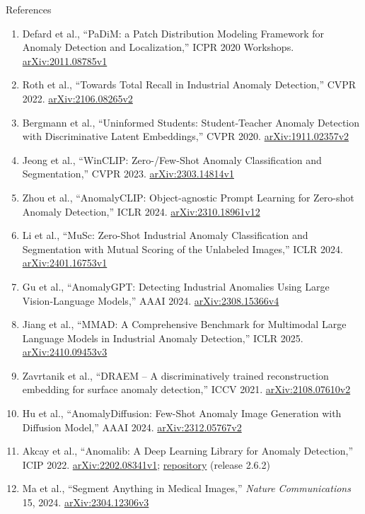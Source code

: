 \begin{frame}[allowframebreaks=0.9]{References}
\begin{enumerate}
    \item Defard et al., ``PaDiM: a Patch Distribution Modeling Framework for Anomaly Detection and Localization,'' ICPR 2020 Workshops. \href{https://arxiv.org/abs/2011.08785v1}{arXiv:2011.08785v1}
    \item Roth et al., ``Towards Total Recall in Industrial Anomaly Detection,'' CVPR 2022. \href{https://arxiv.org/abs/2106.08265v2}{arXiv:2106.08265v2}
    \item Bergmann et al., ``Uninformed Students: Student-Teacher Anomaly Detection with Discriminative Latent Embeddings,'' CVPR 2020. \href{https://arxiv.org/abs/1911.02357v2}{arXiv:1911.02357v2}
    \item Jeong et al., ``WinCLIP: Zero-/Few-Shot Anomaly Classification and Segmentation,'' CVPR 2023. \href{https://arxiv.org/abs/2303.14814v1}{arXiv:2303.14814v1}
    \item Zhou et al., ``AnomalyCLIP: Object-agnostic Prompt Learning for Zero-shot Anomaly Detection,'' ICLR 2024. \href{https://arxiv.org/abs/2310.18961v12}{arXiv:2310.18961v12}
    \item Li et al., ``MuSc: Zero-Shot Industrial Anomaly Classification and Segmentation with Mutual Scoring of the Unlabeled Images,'' ICLR 2024. \href{https://arxiv.org/abs/2401.16753v1}{arXiv:2401.16753v1}
    \item Gu et al., ``AnomalyGPT: Detecting Industrial Anomalies Using Large Vision-Language Models,'' AAAI 2024. \href{https://arxiv.org/abs/2308.15366v4}{arXiv:2308.15366v4}
    \item Jiang et al., ``MMAD: A Comprehensive Benchmark for Multimodal Large Language Models in Industrial Anomaly Detection,'' ICLR 2025. \href{https://arxiv.org/abs/2410.09453v3}{arXiv:2410.09453v3}
    \item Zavrtanik et al., ``DRAEM -- A discriminatively trained reconstruction embedding for surface anomaly detection,'' ICCV 2021. \href{https://arxiv.org/abs/2108.07610v2}{arXiv:2108.07610v2}
    \item Hu et al., ``AnomalyDiffusion: Few-Shot Anomaly Image Generation with Diffusion Model,'' AAAI 2024. \href{https://arxiv.org/abs/2312.05767v2}{arXiv:2312.05767v2}
    \item Akcay et al., ``Anomalib: A Deep Learning Library for Anomaly Detection,'' ICIP 2022. \href{https://arxiv.org/abs/2202.08341v1}{arXiv:2202.08341v1}; \href{https://github.com/open-edge-platform/anomalib}{repository} (release 2.6.2)
    \item Ma et al., ``Segment Anything in Medical Images,'' \textit{Nature Communications} 15, 2024. \href{https://arxiv.org/abs/2304.12306v3}{arXiv:2304.12306v3}

\end{enumerate}
\end{frame}
